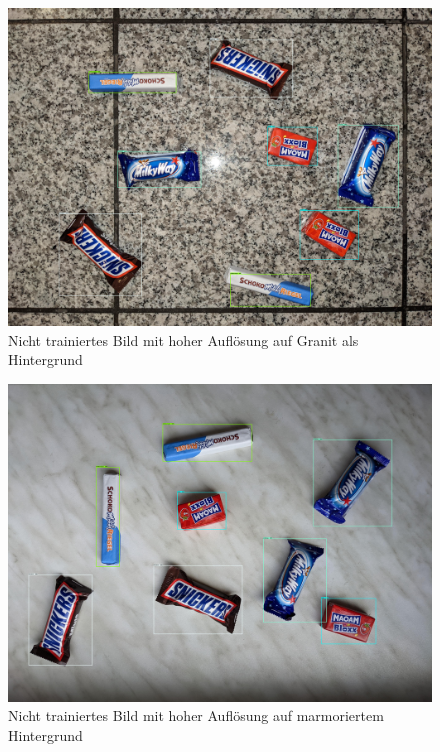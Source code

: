     \begin{figure}[H]
        \centering
        \includegraphics[angle = 90, width = \textwidth]{Bilder/models/model_comparison/faster_rcnn_resnet101_v1_640x640_coco17_tpu-8/HD_on_granite.jpg}
        \caption{Nicht trainiertes Bild mit hoher Auflösung auf Granit als Hintergrund}
    \end{figure}
    
    \begin{figure}[H]
        \centering
        \includegraphics[angle = 90, width = \textwidth]{Bilder/models/model_comparison/faster_rcnn_resnet101_v1_640x640_coco17_tpu-8/HD_on_marble.jpg}
        \caption{Nicht trainiertes Bild mit hoher Auflösung auf marmoriertem Hintergrund}
    \end{figure}
    

